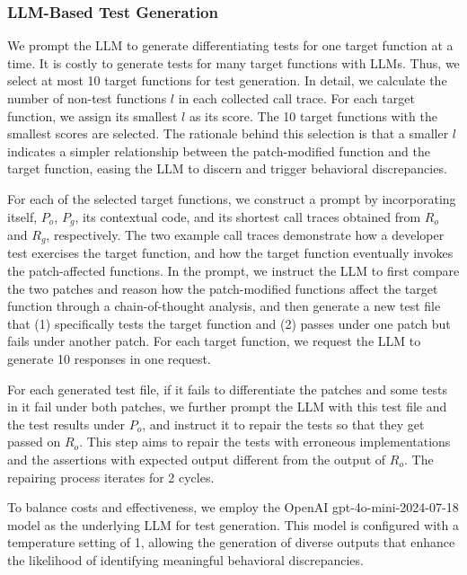 \subsubsection{LLM-Based Test Generation}
We prompt the LLM to generate differentiating tests for one target function at a time.
It is costly to generate tests for many target functions with LLMs.
Thus, we select at most 10 target functions for test generation. In detail, we calculate the number of non-test functions $l$ in each collected call trace. For each target function, we assign its smallest $l$ as its score.
The 10 target functions with the smallest scores are selected.
The rationale behind this selection is that a smaller $l$ indicates a simpler relationship between the patch-modified function and the target function, easing the LLM to discern and trigger behavioral discrepancies.

For each of the selected target functions, we construct a prompt by incorporating itself, $P_o$, $P_g$, its contextual code, and its shortest call traces obtained from $R_o$ and $R_g$, respectively. 
The two example call traces demonstrate how a developer test exercises the target function, and how the target function eventually invokes the patch-affected functions. 
In the prompt, we instruct the LLM to first compare the two patches and reason how the patch-modified functions affect the target function through a chain-of-thought analysis, and then generate a new test file that (1) specifically tests the target function and (2) passes under one patch but fails under another patch. 
For each target function, we request the LLM to generate 10 responses in one request. 

For each generated test file, if it fails to differentiate the patches and some tests in it fail under both patches, 
we further prompt the LLM with this test file and the test results under $P_o$, and instruct it to repair the tests so that they get passed on $R_o$. 
This step aims to repair the tests with erroneous implementations and the assertions with expected output different from the output of $R_o$.
The repairing process iterates for 2 cycles. 

To balance costs and effectiveness, we employ the OpenAI gpt-4o-mini-2024-07-18 model as the underlying LLM for test generation. 
This model is configured with a temperature setting of 1, allowing the generation of diverse outputs that enhance the likelihood of identifying meaningful behavioral discrepancies.


